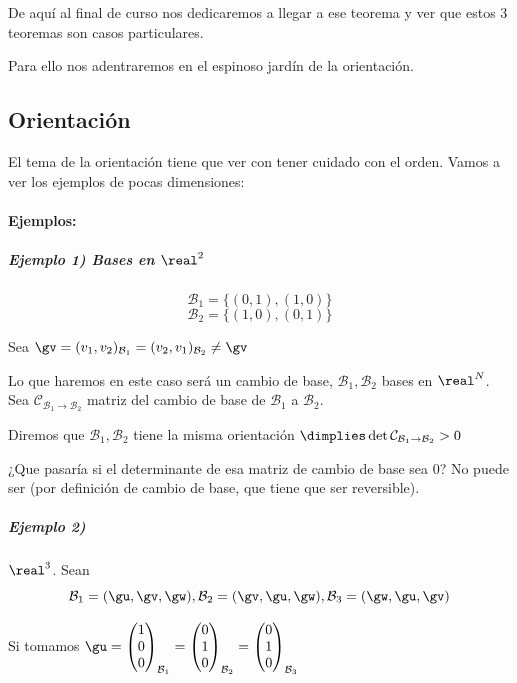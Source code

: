 De aquí al final de curso nos dedicaremos a llegar a ese teorema y ver que estos 3 teoremas son casos particulares.

Para ello nos adentraremos en el espinoso jardín de la orientación.

\subsection{Orientación}
El tema de la orientación tiene que ver con tener cuidado con el orden. Vamos a ver los ejemplos de pocas dimensiones:

\paragraph{Ejemplos:}

\subparagraph{Ejemplo 1) Bases en $\real^2$}

\[\mathcal{B}_1 = \{(0,1),(1,0)\}\]
\[\mathcal{B}_2 = \{(1,0),(0,1)\}\]

Sea $\gv = (v_1,v_2)_{\mathcal{B}_1} = (v_2,v_1)_{\mathcal{B}_2} \neq \gv$

Lo que haremos en este caso será un cambio de base, $\mathcal{B}_1,\mathcal{B}_2$ bases en $\real^N$. Sea $\mathcal{C}_{\mathcal{B}_1\to\mathcal{B}_2}$ matriz del cambio de base de $\mathcal{B}_1$ a $\mathcal{B}_2$.

\begin{defn}[Orientación]
Diremos que $\mathcal{B}_1,\mathcal{B}_2$ tiene la misma orientación $\dimplies \det \mathcal{C}_{\mathcal{B}_1\to\mathcal{B}_2} > 0$
\end{defn}

¿Que pasaría si el determinante de esa matriz de cambio de base sea 0? No puede ser (por definición de cambio de base, que tiene que ser reversible).

\subparagraph{Ejemplo 2)} $\real^3$.
Sean
\[\mathcal{B}_1 = (\gu,\gv,\gw),\mathcal{B}_2 = (\gv,\gu,\gw),\mathcal{B}_3 = (\gw,\gu,\gv)\]

Si tomamos $\gu = \begin{pmatrix} 1\\0\\0\end{pmatrix}_{\mathcal{B}_1} = \begin{pmatrix}0\\1\\0\end{pmatrix}_{\mathcal{B}_2} = \begin{pmatrix}0\\1\\0\end{pmatrix}_{\mathcal{B}_3} $

